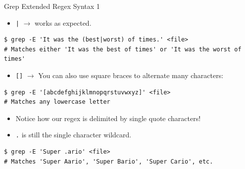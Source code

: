 \documentclass[11pt]{beamer}
\begin{document}
\begin{frame}[fragile=singleslide]{Grep Extended Regex Syntax 1} 
\begin{itemize}
\item \texttt{|} $\rightarrow$ works as expected.
\end{itemize}
\begin{lstlisting}[style=terminal]
$ grep -E 'It was the (best|worst) of times.' <file>
# Matches either 'It was the best of times' or 'It was the worst of times'
\end{lstlisting}
\begin{itemize}
\item \texttt{[]} $\rightarrow$ You can also use square braces to alternate many characters:
\end{itemize}

\begin{lstlisting}[style=terminal]
$ grep -E '[abcdefghijklmnopqrstuvwxyz]' <file>
# Matches any lowercase letter
\end{lstlisting}
\begin{itemize}
\item Notice how our regex is delimited by single quote characters! 
\item \texttt{.} is still the single character wildcard.
\end{itemize}
\begin{lstlisting}[style=terminal]
$ grep -E 'Super .ario' <file>
# Matches 'Super Aario', 'Super Bario', 'Super Cario', etc.
\end{lstlisting}
\end{frame}
\end{document}
